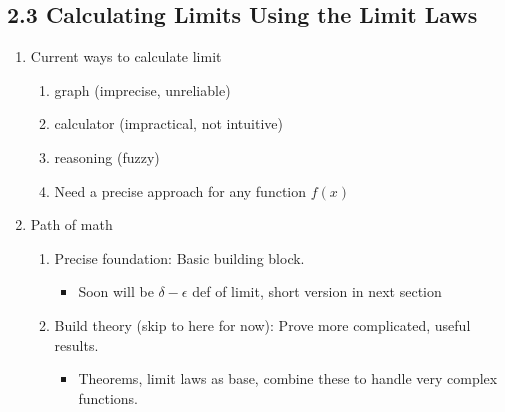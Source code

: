 \documentclass{article}
\begin{document}
\noindent \subsection{2.3 Calculating Limits Using the Limit Laws}
\begin{enumerate}

\item Current ways to calculate limit
\begin{enumerate}
\item graph (imprecise, unreliable)
\item  calculator (impractical, not intuitive)
\item  reasoning (fuzzy)
\item Need a precise approach for any function $f(x)$
\end{enumerate}


\item Path of math
\begin{enumerate}
\item Precise foundation: Basic building block.
\begin{itemize}
\item Soon will be $\delta - \epsilon$ def of limit, short version in next section
\end{itemize}  
\item Build theory (skip to here for now): Prove more complicated, useful results.
\begin{itemize}
\item  Theorems, limit laws as base, combine these to handle very complex functions.
\end{itemize}
\end{enumerate}


\end{enumerate}
\end{document}

